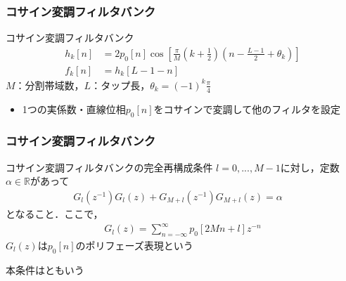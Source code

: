 \documentclass[14pt,xcolor=dvipsnames,table,dvipdfmx]{beamer}
\begin{document}
\begin{frame}[c]
    \frametitle{コサイン変調フィルタバンク}
    \begin{block}{コサイン変調フィルタバンク}
        \vspace{-10pt}
        \begin{align}
            h_{k}[n] &= 2 p_{0}[n] \cos \left[ \frac{\pi}{M} \left( k + \frac{1}{2} \right) \left( n - \frac{L - 1}{2} + \theta_{k} \right) \right] \label{eq:cos_modulated_analysis_filter} \\
            f_{k}[n] &= h_{k}[L - 1 - n] \label{eq:cos_modulated_synthesis_filter}
        \end{align}
        $M$：分割帯域数，$L$：タップ長，$\theta_{k} = (-1)^{k} \frac{\pi}{4}$
    \end{block}
    \begin{itemize}
        \item 1つの実係数・直線位相$p_{0}[n]$をコサインで変調して他のフィルタを設定
    \end{itemize}
\end{frame}

\begin{frame}[c]
    \frametitle{コサイン変調フィルタバンク}
    \begin{block}{コサイン変調フィルタバンクの完全再構成条件}
        $l = 0, ..., M-1$に対し，定数$\alpha \in \mathbb{R}$があって
        \begin{align}
            G_{l}(z^{-1}) G_{l}(z) + G_{M + l}(z^{-1}) G_{M + l}(z) = \alpha \quad 
        \end{align}
        となること．ここで，
        \begin{align}
            G_{l}(z) = \sum_{n = -\infty}^{\infty} p_{0}[2Mn + l] z^{-n} \label{eq:polyphase_representation_of_prototype}
        \end{align}
        $G_{l}(z)$は$p_{0}[n]$のポリフェーズ表現という
    \end{block}
    本条件はともいう
\end{frame}
\end{document}
